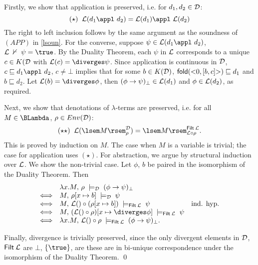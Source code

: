 Firstly, we show that application is preserved, i.e. for 
$d_{1}, d_{2} \in {\cal D}$:
\[ (\star ) \;\; {\cal L}(d_{1} \appl\ d_{2}) = {\cal L}(d_{1}) \appl\ {\cal L}(d_{2}) \]
The right to left inclusion follows by the same argument as the soundness of 
$(APP)$ in \ref{lsoun}. 
For the converse, suppose $\psi \in {\cal L}(d_{1} \appl\  d_{2})$, 
${\cal L} \; \nvdash \; \psi = \true$. 
By the Duality Theorem, each $\psi$ in ${\cal L}$ corresponds to a unique 
$c \in K({\cal D}$ with ${\cal L}(c) = {\diverges} \psi$. 
Since application is continuous in $\cal D$, $c \sqsubseteq d_{1}\appl\ d_{2}$, 
$c \neq \bot$ implies that for some $b \in K({\cal D})$, 
${\sf fold}({<}0, [b,c]{>}) \sqsubseteq d_{1}$ and 
$b \sqsubseteq d_{2}$. Let ${\cal L}(b) = {\diverges} \phi$, 
then $(\phi \rightarrow \psi )_{\bot} \in {\cal L}(d_{1})$ and 
$\phi \in {\cal L}(d_{2})$, as required.

Next, we show that denotations of $\lambda$-terms are preserved, i.e. for all 
$M \in \BLambda$, $\rho \in Env({\cal D})$:
\[ (\star \star ) \;\; {\cal L}( \lsem M \rsem^{\cal D}_{\rho}) = \lsem M \rsem^{{\sf Filt} \: {\cal L}}_{{\cal L} \circ \rho} . \]
This is proved by induction on $M$. The case when $M$ is a variable is trivial; 
the case for application uses $(\star )$. For abstraction, 
we argue by structural induction over ${\cal L}$. 
We show the non-trivial case. 
Let $\phi$, $b$ be paired in the isomorphism of the Duality Theorem. Then
\[ \begin{array}{clr}
& \lambda x . M , \, \rho \; \models_{\cal D} \; (\phi \rightarrow \psi )_{\bot} & \\
\Longleftrightarrow &  M , \, \rho [ x \mapsto b ] \; \models_{\cal D} \; \psi & \\
\Longleftrightarrow &  M , \, {\cal L}() \circ (\rho [ x \mapsto b ]) \; \models_{{\sf Filt} \: {\cal L}} \; \psi & \mbox{ind. hyp.} \\
\Longleftrightarrow &  M , \, ({\cal L}() \circ \rho ) [ x \mapsto \diverges \phi ] \; \models_{{\sf Filt} \: {\cal L}} \; \psi  & \\
\Longleftrightarrow & \lambda x . M , \, {\cal L}() \circ \rho \; \models_{{\sf Filt} \: {\cal L}} \; (\phi \rightarrow \psi )_{\bot} . &
\end{array} \]

Finally, divergence is trivially preserved, since the only divergent 
elements in 
$\cal D$, ${\sf Filt} \: {\cal L}$ are $\bot$, $\{ \true \}$, are these are in 
bi-unique correspondence under the isomorphism of the Duality Theorem. \qed

